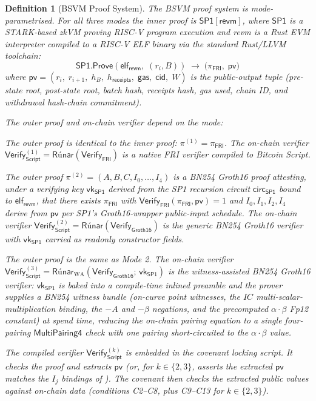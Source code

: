 \documentclass[11pt,a4paper]{article}
\newtheorem{definition}{Definition}[section]
\newcommand{\Verify}{\mathsf{Verify}}
\newcommand{\Prove}{\mathsf{Prove}}
\newcommand{\FRI}{\mathsf{FRI}}
\newcommand{\Groth}{\mathsf{Groth16}}    %
\newcommand{\SPone}{\mathsf{SP1}}
\newcommand{\revm}{\textsf{revm}}
\newcommand{\Runar}{\textsf{R\'{u}nar}}
\newcommand{\vkSP}{\mathsf{vk}_{\SPone}}           %
\begin{document}
\begin{definition}[BSVM Proof System]\label{def:proof-system}
The BSVM proof system is mode-parametrised. For all three modes the inner proof is $\SPone[\revm]$, where $\SPone$ is a STARK-based zkVM proving RISC-V program execution and \revm{} is a Rust EVM interpreter compiled to a RISC-V ELF binary via the standard Rust/LLVM toolchain:
\[
    \SPone.\Prove(\mathsf{elf}_{\revm},\; (r_i, B)) \;\to\; \bigl(\pi_{\FRI},\; \mathsf{pv}\bigr)
\]
where $\mathsf{pv} = (r_i,\; r_{i+1},\; h_B,\; h_{\mathsf{receipts}},\; \mathsf{gas},\; \mathsf{cid},\; W)$ is the public-output tuple (pre-state root, post-state root, batch hash, receipts hash, gas used, chain ID, and withdrawal hash-chain commitment).

The outer proof and on-chain verifier depend on the mode:
\begin{description}[nosep,leftmargin=0em]
    \item[Mode 1 (Basefold).] The outer proof is identical to the inner proof: $\pi^{(1)} = \pi_{\FRI}$. The on-chain verifier $\Verify_{\mathsf{Script}}^{(1)} = \Runar(\Verify_{\FRI})$ is a native FRI verifier compiled to Bitcoin Script.
    \item[Mode 2 (Groth16).] The outer proof $\pi^{(2)} = (A, B, C, I_0, \ldots, I_4)$ is a BN254 Groth16 proof attesting, under a verifying key $\vkSP$ derived from the SP1 recursion circuit $\mathsf{circ}_{\SPone}$ bound to $\mathsf{elf}_{\revm}$, that there exists $\pi_{\FRI}$ with $\Verify_{\FRI}(\pi_{\FRI}, \mathsf{pv}) = 1$ and $I_0, I_1, I_2, I_4$ derive from $\mathsf{pv}$ per SP1's Groth16-wrapper public-input schedule. The on-chain verifier $\Verify_{\mathsf{Script}}^{(2)} = \Runar(\Verify_{\Groth})$ is the generic BN254 Groth16 verifier with $\vkSP$ carried as readonly constructor fields.
    \item[Mode 3 (Groth16-WA).] The outer proof is the same as Mode 2. The on-chain verifier $\Verify_{\mathsf{Script}}^{(3)} = \Runar_{\mathrm{WA}}(\Verify_{\Groth};\, \vkSP)$ is the witness-assisted BN254 Groth16 verifier: $\vkSP$ is baked into a compile-time inlined preamble and the prover supplies a BN254 witness bundle (on-curve point witnesses, the $IC$ multi-scalar-multiplication binding, the $-A$ and $-\beta$ negations, and the precomputed $\alpha \cdot \beta$ Fp12 constant) at spend time, reducing the on-chain pairing equation to a single four-pairing $\mathsf{MultiPairing4}$ check with one pairing short-circuited to the $\alpha \cdot \beta$ value.
\end{description}

The compiled verifier $\Verify_{\mathsf{Script}}^{(k)}$ is embedded in the covenant locking script. It checks the proof and extracts $\mathsf{pv}$ (or, for $k \in \{2, 3\}$, asserts the extracted $\mathsf{pv}$ matches the $I_j$ bindings of ). The covenant then checks the extracted public values against on-chain data (conditions C2--C8, plus C9--C13 for $k \in \{2, 3\}$).
\end{definition}
\end{document}
